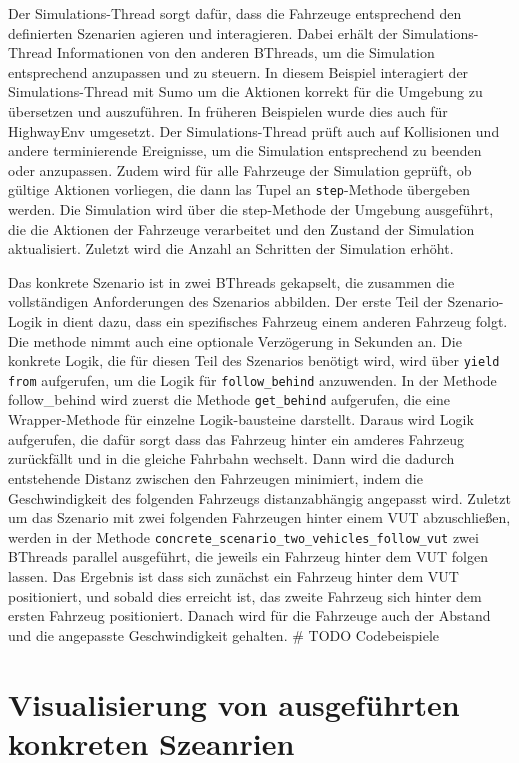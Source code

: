 Der Simulations-Thread sorgt dafür, dass die Fahrzeuge entsprechend den definierten Szenarien agieren und interagieren. Dabei erhält der Simulations-Thread Informationen von den anderen BThreads, um die Simulation entsprechend anzupassen und zu steuern.
In diesem Beispiel interagiert der Simulations-Thread mit Sumo um die Aktionen korrekt für die Umgebung zu übersetzen und auszuführen. In früheren Beispielen wurde dies auch für HighwayEnv umgesetzt.
Der Simulations-Thread prüft auch auf Kollisionen und andere terminierende Ereignisse, um die Simulation entsprechend zu beenden oder anzupassen. Zudem wird für alle Fahrzeuge der Simulation geprüft, ob gültige Aktionen vorliegen, die dann las Tupel an \texttt{step}-Methode übergeben werden.
Die Simulation wird über die step-Methode der Umgebung ausgeführt, die die Aktionen der Fahrzeuge verarbeitet und den Zustand der Simulation aktualisiert. Zuletzt wird die Anzahl an Schritten der Simulation erhöht.

Das konkrete Szenario ist in zwei BThreads gekapselt, die zusammen die vollständigen Anforderungen des Szenarios abbilden. Der erste Teil der Szenario-Logik in dient dazu, dass ein spezifisches Fahrzeug einem anderen Fahrzeug folgt. Die methode nimmt auch eine optionale Verzögerung in Sekunden an.
Die konkrete Logik, die für diesen Teil des Szenarios benötigt wird, wird über \texttt{yield from} aufgerufen, um die Logik für \texttt{follow\_behind} anzuwenden. In der Methode follow_behind wird zuerst die Methode \texttt{get\_behind} aufgerufen, die eine Wrapper-Methode für einzelne Logik-bausteine darstellt.
Daraus wird Logik aufgerufen, die dafür sorgt dass das Fahrzeug hinter ein amderes Fahrzeug zurückfällt und in die gleiche Fahrbahn wechselt. Dann wird die dadurch entstehende Distanz zwischen den Fahrzeugen minimiert, indem die Geschwindigkeit des folgenden Fahrzeugs distanzabhängig angepasst wird.
Zuletzt um das Szenario mit zwei folgenden Fahrzeugen hinter einem VUT abzuschließen, werden in der Methode \texttt{concrete\_scenario\_two\_vehicles\_follow\_vut} zwei BThreads parallel ausgeführt, die jeweils ein Fahrzeug hinter dem VUT folgen lassen.
Das Ergebnis ist dass sich zunächst ein Fahrzeug hinter dem VUT positioniert, und sobald dies erreicht ist, das zweite Fahrzeug sich hinter dem ersten Fahrzeug positioniert. Danach wird für die Fahrzeuge auch der Abstand und die angepasste Geschwindigkeit gehalten.
# TODO Codebeispiele

\section{Visualisierung von ausgeführten konkreten Szeanrien}
